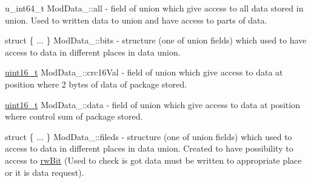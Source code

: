 \mbox{\label{unionModData___a5d5568437f4a29d0ff4e32bfcd7c5923}} 
{\footnotesize\ttfamily u\+\_\+int64\+\_\+t Mod\+Data\+\_\+\+::\texorpdfstring{all}{all}} - field of union which give access to all data stored in union. Used to written data to union and have access to parts of data.

\mbox{\label{unionModData___aa4dd5ccccd7727341bbc1c0027521a66}} 
{\footnotesize\ttfamily struct \{ ... \}  Mod\+Data\+\_\+\+::\texorpdfstring{bits}{bits}} - structure (one of union fields) which used to have access to data in different places in data union.

\mbox{\label{unionModData___a806e3925e1b4722056cb8f0b46ab9407}} 
{\footnotesize\ttfamily \mbox{\hyperlink{settings_8h_a017dd44e68049ffdd31500a8cd01ba68}{uint16\+\_\+t}} Mod\+Data\+\_\+\+::\texorpdfstring{crc16\+Val}{crc16Val}} - field of union which give access to data at position where 2 bytes of data of package stored.

\mbox{\label{unionModData___a9da744053275e3ee8e1e8a64e8bed7c3}} 
{\footnotesize\ttfamily \mbox{\hyperlink{settings_8h_a017dd44e68049ffdd31500a8cd01ba68}{uint16\+\_\+t}} Mod\+Data\+\_\+\+::\texorpdfstring{data}{data}} - field of union which give access to data at position where control sum of package stored.

\mbox{\label{unionModData___a64b11d6c2878de78325bf04f1e77dcf7}} 
{\footnotesize\ttfamily struct \{ ... \}  Mod\+Data\+\_\+\+::\texorpdfstring{fileds}{fileds}} - structure (one of union fields) which used to access to data in different places in data union. Created to have possibility to access to \hyperlink{unionModData___ace1455957fe106915d531b3f37c991dd}{rwBit} (Used to check is got data must be written to appropriate place or it is data request).  

